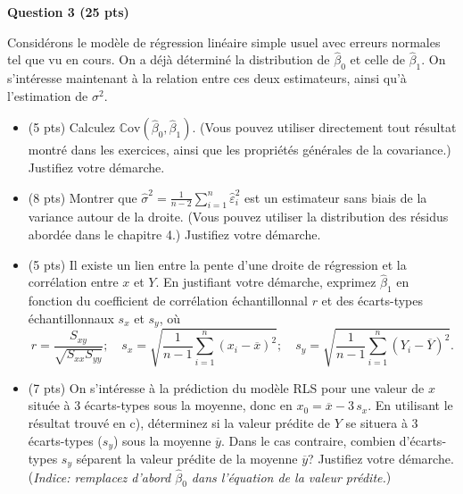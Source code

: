 \documentclass[letter, 11pt]{article}
\newcommand{\cov}{\mathbb{C}\text{ov}}
\begin{document}
\vspace{0.2 in}


\textbf{Question 3 (25 pts)} 

Considérons le modèle de régression linéaire simple usuel avec erreurs normales tel que vu en cours. On a déjà déterminé la distribution de $\hat{\beta}_0$ et celle de $\hat{\beta}_1$. On s'intéresse maintenant à la relation entre ces deux estimateurs, ainsi qu'à l'estimation de $\sigma^2$. 

\begin{itemize}\itemsep4mm
\item[(a)] (5 pts) Calculez $\cov (\hat{\beta}_0, \hat{\beta}_1)$. (Vous pouvez utiliser directement tout résultat montré dans les exercices, ainsi que les propriétés générales de la covariance.) Justifiez votre démarche.
\item[(b)] (8 pts) Montrer que $\displaystyle \hat\sigma^2=\frac{1}{n-2} \sum\limits_{i=1}^n \hat\varepsilon_i^2$ est un estimateur sans biais de la variance autour de la droite. (Vous pouvez utiliser  la distribution des résidus abordée dans le chapitre 4.) Justifiez votre démarche.
\item[(c)] (5 pts) Il existe un lien entre la pente d'une droite de régression et la corrélation entre $x$ et $Y$. En justifiant votre démarche, exprimez $\hat\beta_1$ en fonction du coefficient de corrélation échantillonnal $r$ et des écarts-types échantillonnaux  $s_x$ et $s_y$, où
$$ r = \frac{S_{xy}}{  \sqrt{S_{xx}S_{yy}}}; \quad s_x= \sqrt{\frac{1}{n-1}\sum_{i=1}^n (x_i-\overline{x})^2}; \quad s_y= \sqrt{\frac{1}{n-1}\sum_{i=1}^n (Y_i-\overline{Y})^2}.$$
\item[(d)] (7 pts) On s'intéresse à la prédiction du modèle RLS pour une valeur de $x$ située à 3 écarts-types sous la moyenne, donc en $x_0=\overline x-3\,s_x$. En utilisant le résultat trouvé en c), déterminez si la valeur prédite de $Y$ se situera à 3 écarts-types ($s_y$) sous la moyenne $\overline y$. Dans le cas contraire,  combien d'écarts-types $s_y$ séparent la valeur prédite de la moyenne $\overline y$? Justifiez votre démarche.\\({\it Indice: remplacez d'abord $\hat\beta_0$ dans l'équation de la valeur prédite.})

\end{itemize}
\end{document}
